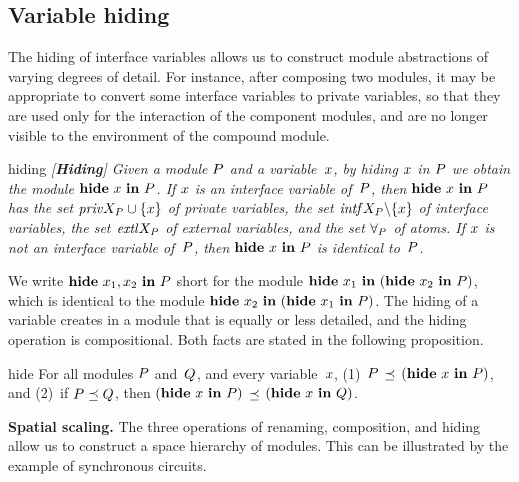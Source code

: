 \subsection{Variable hiding}

The hiding of interface variables allows us to construct module abstractions
of varying degrees of detail.
For instance, after composing two modules, it may be appropriate to convert
some interface variables to private variables, so that they are used only for
the interaction of the component modules, and are no longer visible to the
environment of the compound module.

\begin{definition}{hiding}\it
  {\em [{\bf Hiding}]}
  Given a module ${P}$ and a variable~$x$, by {\em hiding\/} $x$ in
  ${P}$ we obtain the module $\HIDE\ \var\ \IN\ \ro$.
  If $x$ is an interface variable of~${P}$, then $\HIDE\ \var\ \IN\ \ro$
  has the set ${\it priv}X_{{P}}\cup\{x\}$ of private variables, the set
  ${\it intf}X_{{P}}\backslash\{x\}$ of interface variables, the set ${\it extl}X_{{P}}$ of
  external variables, and the set $\forall_{{P}}$ of atoms.
  If $x$ is not an interface variable of~${P}$, then
  $\HIDE\ \var\ \IN\ \ro$ is identical to~${P}$.
\end{definition}

\mypar
We write $\HIDE\ \var_1,\var_2\ \IN\ \ro$ short for the module
$\HIDE\ \var_1\ \IN\ (\HIDE\ \var_2\ \IN\ \ro)$, which is identical to the
module $\HIDE\ \var_2\ \IN\ (\HIDE\ \var_1\ \IN\ \ro)$.
The hiding of a variable creates in a module that is equally or less
detailed, and the hiding operation is compositional.
Both facts are stated in the following proposition.

\begin{proposition}{hide}
  For all modules ${P}$ and~${Q}$, and every variable~$x$,
  (1)~${P}$ $\preceq$ $(\HIDE\ \var\ \IN\ \ro)$, and
  (2)~if ${P}\preceq{Q}$, then
    $(\HIDE\ \var\ \IN\ \ro)$ $\preceq$ $(\HIDE\ \var\ \IN\ \aro)$.
\end{proposition}

\mypar
{\bf Spatial scaling.}
The three operations of renaming, composition, and hiding allow us to
construct a space hierarchy of modules.
This can be illustrated by the example of synchronous circuits.

